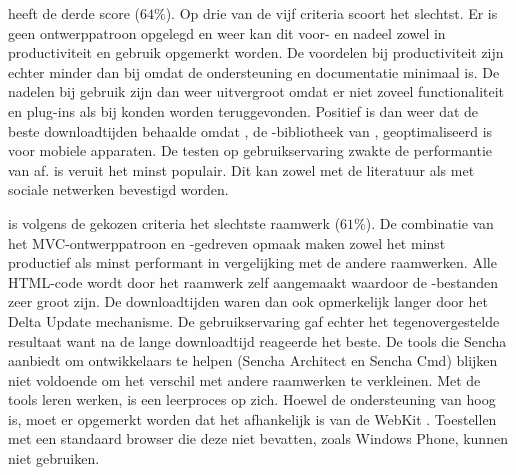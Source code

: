 
\lungo{} heeft de derde score ($64\%$).
Op drie van de vijf criteria scoort \lungo{} het slechtst.
Er is geen ontwerppatroon opgelegd en weer kan dit voor- en nadeel zowel in productiviteit en gebruik opgemerkt worden.
De voordelen bij productiviteit zijn echter minder dan bij \jqm{} omdat de ondersteuning en documentatie minimaal is.
De nadelen bij gebruik zijn dan weer uitvergroot omdat er niet zoveel functionaliteit en plug-ins als bij \jqm{} konden worden teruggevonden.
Positief is dan weer dat \lungo{} de beste downloadtijden behaalde omdat \quo{}, de \js{}-bibliotheek van \lungo{},  geoptimaliseerd is voor mobiele apparaten.
De testen op gebruikservaring zwakte de performantie van \lungo{} af.
\lungo{} is veruit het minst populair.
Dit kan zowel met de literatuur als met sociale netwerken bevestigd worden.


\st{} is volgens de gekozen criteria het slechtste raamwerk ($61\%$).
De combinatie van het MVC-ontwerppatroon en \js-gedreven opmaak maken \st{} zowel het minst productief als minst performant in vergelijking met de andere raamwerken.
Alle HTML-code wordt door het raamwerk zelf aangemaakt waardoor de \js-bestanden zeer groot zijn.
De downloadtijden waren dan ook opmerkelijk langer door het Delta Update mechanisme.
De gebruikservaring gaf echter het tegenovergestelde resultaat want na de lange downloadtijd reageerde \st{} het beste.
De tools die Sencha aanbiedt om ontwikkelaars te helpen (Sencha Architect en Sencha Cmd) blijken niet voldoende om het verschil met andere raamwerken te verkleinen.
Met de tools leren werken, is een leerproces op zich.
Hoewel de ondersteuning van \st{} hoog is, moet er opgemerkt worden dat het afhankelijk is van de WebKit .
Toestellen met een standaard browser die deze  niet bevatten, zoals Windows Phone,  kunnen \st{} niet gebruiken.

